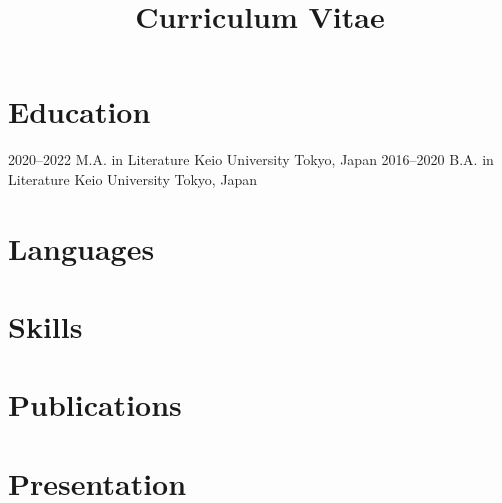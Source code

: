 \documentclass[11pt,a4paper,sans]{moderncv}
\title{Curriculum Vitae}
\begin{document}
\makecvtitle

\section{Education}
	\cventry
		{2020--2022}
		{M.A. in Literature}
		{Keio University}
		{Tokyo, Japan}{}{}
	\cventry
		{2016--2020}
		{B.A. in Literature}
		{Keio University}
		{Tokyo, Japan}{}{}

\section{Languages}

\section{Skills}

\section{Publications}

\section{Presentation}

\section{}
\end{document}
